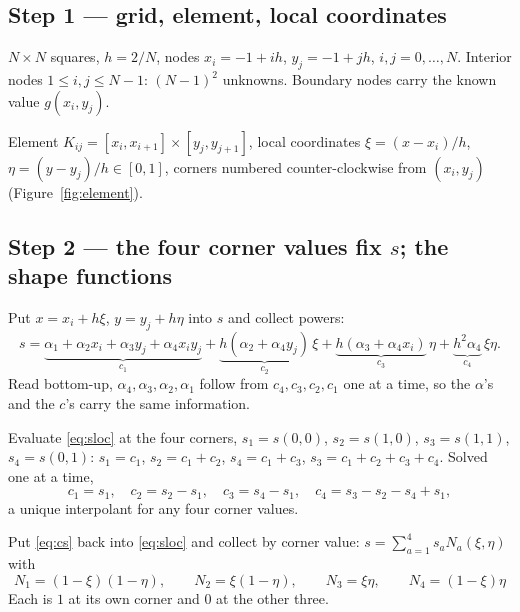 \documentclass[11pt]{article}
\begin{document}
\subsection*{Step 1 --- grid, element, local coordinates}

\begin{steps}
\item $N\times N$ squares, $h=2/N$, nodes $x_{i}=-1+ih$, $y_{j}=-1+jh$,
      $i,j=0,\dots,N$.  Interior nodes $1\le i,j\le N-1$: $(N-1)^{2}$ unknowns.
      Boundary nodes carry the known value $g(x_{i},y_{j})$.
\item Element $K_{ij}=[x_{i},x_{i+1}]\times[y_{j},y_{j+1}]$, local coordinates
      $\xi=(x-x_{i})/h$, $\eta=(y-y_{j})/h\in[0,1]$, corners numbered
      counter-clockwise from $(x_{i},y_{j})$ (Figure~\ref{fig:element}).
\end{steps}

\subsection*{Step 2 --- the four corner values fix $s$; the shape functions}

\begin{steps}
\item Put $x=x_{i}+h\xi$, $y=y_{j}+h\eta$ into $s$ and collect powers:
\begin{equation}\label{eq:sloc}
  s=\underbrace{\alpha_{1}+\alpha_{2}x_{i}+\alpha_{3}y_{j}+\alpha_{4}x_{i}y_{j}}_{c_{1}}
   +\underbrace{h(\alpha_{2}+\alpha_{4}y_{j})}_{c_{2}}\,\xi
   +\underbrace{h(\alpha_{3}+\alpha_{4}x_{i})}_{c_{3}}\,\eta
   +\underbrace{h^{2}\alpha_{4}}_{c_{4}}\,\xi\eta .
\end{equation}
      Read bottom-up, $\alpha_{4},\alpha_{3},\alpha_{2},\alpha_{1}$ follow from
      $c_{4},c_{3},c_{2},c_{1}$ one at a time, so the $\alpha$'s and the $c$'s
      carry the same information.
\item Evaluate \eqref{eq:sloc} at the four corners, $s_{1}=s(0,0)$,
      $s_{2}=s(1,0)$, $s_{3}=s(1,1)$, $s_{4}=s(0,1)$:
      $s_{1}=c_{1}$, $s_{2}=c_{1}+c_{2}$, $s_{4}=c_{1}+c_{3}$,
      $s_{3}=c_{1}+c_{2}+c_{3}+c_{4}$.  Solved one at a time,
\begin{equation}\label{eq:cs}
  c_{1}=s_{1},\quad c_{2}=s_{2}-s_{1},\quad c_{3}=s_{4}-s_{1},\quad
  c_{4}=s_{3}-s_{2}-s_{4}+s_{1},
\end{equation}
      a unique interpolant for any four corner values.
\item Put \eqref{eq:cs} back into \eqref{eq:sloc} and collect by corner value:
      $s=\sum_{a=1}^{4}s_{a}N_{a}(\xi,\eta)$ with
\begin{equation}\label{eq:shapes}
  \boxed{\;N_{1}=(1-\xi)(1-\eta),\qquad N_{2}=\xi(1-\eta),\qquad
          N_{3}=\xi\eta,\qquad N_{4}=(1-\xi)\eta\;}
\end{equation}
      Each is $1$ at its own corner and $0$ at the other three.
\end{steps}
\end{document}
